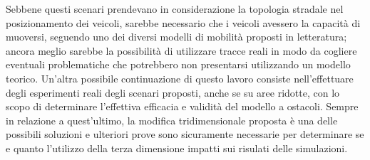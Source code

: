 Sebbene questi scenari prendevano in considerazione la topologia stradale nel posizionamento dei veicoli,
sarebbe necessario che i veicoli avessero la capacità di muoversi, seguendo uno dei diversi modelli di mobilità
proposti in letteratura;
ancora meglio sarebbe la possibilità di utilizzare tracce reali in modo da cogliere eventuali problematiche
che potrebbero non presentarsi utilizzando un modello teorico.
Un'altra possibile continuazione di questo lavoro consiste nell'effettuare degli esperimenti reali
degli scenari proposti, anche se su aree ridotte, con lo scopo di determinare l'effettiva efficacia e
validità del modello a ostacoli.
Sempre in relazione a quest'ultimo, la modifica tridimensionale proposta è una delle
possibili soluzioni e ulteriori prove sono sicuramente necessarie per determinare
se e quanto l'utilizzo della terza dimensione impatti sui risulati delle simulazioni.
